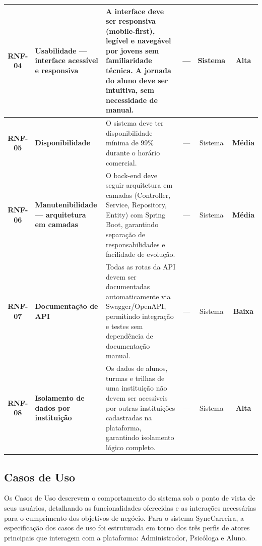 {\begin{longtable}{|c|p{2.5cm}|p{4.5cm}|c|c|c|}
    \textcolor{blue!70!black}{\textbf{RNF-04}} & 
    \textbf{Usabilidade --- interface acessível e responsiva} & 
    A interface deve ser responsiva (mobile-first), legível e navegável por jovens sem familiaridade técnica. A jornada do aluno deve ser intuitiva, sem necessidade de manual. & 
    --- & 
    Sistema & 
    \textcolor{red!80!black}{\textbf{Alta}} \\
    \hline
    
    \textcolor{blue!70!black}{\textbf{RNF-05}} & 
    \textbf{Disponibilidade} & 
    O sistema deve ter disponibilidade mínima de 99\% durante o horário comercial. & 
    --- & 
    Sistema & 
    \textcolor{orange!80!black}{\textbf{Média}} \\
    \hline

    \textcolor{blue!70!black}{\textbf{RNF-06}} & 
    \textbf{Manutenibilidade --- arquitetura em camadas} & 
    O back-end deve seguir arquitetura em camadas (Controller, Service, Repository, Entity) com Spring Boot, garantindo separação de responsabilidades e facilidade de evolução. & 
    --- & 
    Sistema & 
    \textcolor{orange!80!black}{\textbf{Média}} \\
    \hline

    \textcolor{blue!70!black}{\textbf{RNF-07}} & 
    \textbf{Documentação de API} & 
    Todas as rotas da API devem ser documentadas automaticamente via Swagger/OpenAPI, permitindo integração e testes sem dependência de documentação manual. & 
    --- & 
    Sistema & 
    \textcolor{green!80!black}{\textbf{Baixa}} \\
    \hline

    \textcolor{blue!70!black}{\textbf{RNF-08}} & 
    \textbf{Isolamento de dados por instituição} & 
    Os dados de alunos, turmas e trilhas de uma instituição não devem ser acessíveis por outras instituições cadastradas na plataforma, garantindo isolamento lógico completo. & 
    --- & 
    Sistema & 
    \textcolor{red!80!black}{\textbf{Alta}} \\
    \hline

\end{longtable}
}

\subsection{Casos de Uso}

Os Casos de Uso descrevem o comportamento do sistema sob o ponto de vista de seus usuários, detalhando as funcionalidades oferecidas e as interações necessárias para o cumprimento dos objetivos de negócio. Para o sistema SyncCarreira, a especificação dos casos de uso foi estruturada em torno dos três perfis de atores principais que interagem com a plataforma: Administrador, Psicóloga e Aluno.

